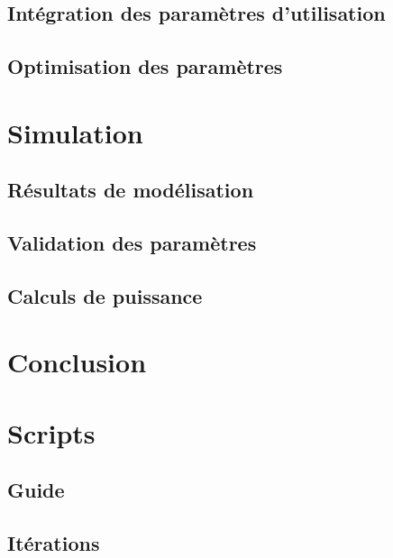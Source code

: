 \documentclass[a4paper,11pt]{report}
\begin{document}
\section{Intégration des paramètres d'utilisation}
\section{Optimisation des paramètres}
\chapter{Simulation} 
\section{Résultats de modélisation}
\section{Validation des paramètres}
\section{Calculs de puissance}
\chapter*{Conclusion}

\appendix
\chapter{Scripts}
\section{Guide}
\section{Itérations}



\end{document}
